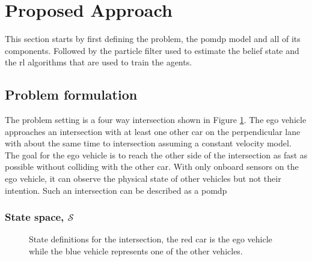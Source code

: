 	\section{Proposed Approach}
	\label{sec:approach}
	This section starts by first defining the problem, the \gls{pomdp} model and all of its components. Followed by the particle filter used to estimate the belief state and the \gls{rl} algorithms that are used to train the agents. 
	
	\subsection{Problem formulation}
	\label{sec:pomdp}
	

	The problem setting is a four way intersection shown in Figure \ref{fig:states}. The ego vehicle approaches an intersection with at least one other car on the perpendicular lane with about the same time to intersection assuming a constant velocity model. The goal for the ego vehicle is to reach the other side of the intersection as fast as possible without colliding with the other car. With only onboard sensors on the ego vehicle, it can observe the physical state of other vehicles but not their intention. 
	Such an intersection can be described as a \gls{pomdp}
	\subsubsection{State space, $\mathcal{S}$}
	\begin{figure}[!t]
		\centering
			\caption{State definitions for the intersection, the red car is the ego vehicle while the blue vehicle represents one of the other vehicles.}
		\label{fig:states}
	\end{figure}
	
